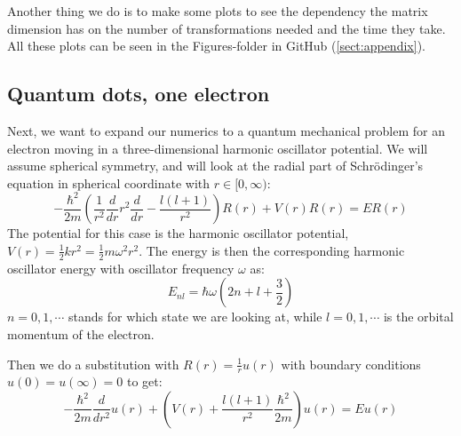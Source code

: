 \documentclass[12pt,a4paper,english]{article}
\begin{document}
Another thing we do is to make some plots to see the dependency the matrix dimension has on the number of transformations needed and the time they take. All these plots can be seen in the Figures-folder in GitHub (\ref{sect:appendix}).

\subsection{Quantum dots, one electron}
\label{sect:quantum_one}
Next, we want to expand our numerics to a quantum mechanical problem for an electron moving in a three-dimensional harmonic oscillator potential. We will assume spherical symmetry, and will look at the radial part of Schrödinger's equation in spherical coordinate with $r\in[0,\infty)$:
\begin{equation}
\label{eq:rad_schr_1}
-\frac{\hbar^2}{2m}\left(\frac{1}{r^2}\frac{d}{dr}r^2\frac{d}{dr}-\frac{l(l+1)}{r^2}\right)R(r) + V(r)R(r)=ER(r)
\end{equation}
The potential for this case is the harmonic oscillator potential, $V(r)=\frac{1}{2}kr^2=\frac{1}{2}m\omega^2r^2$. The energy is then the corresponding harmonic oscillator energy with oscillator frequency $\omega$ as:
\begin{equation}
\label{eq:HO_energy_1}
E_{nl} = \hbar \omega\left(2n + l + \frac{3}{2}\right)
\end{equation}
$n=0,1,\cdots$ stands for which state we are looking at, while $l=0,1,\cdots$ is the orbital momentum of the electron. 

Then we do a substitution with $R(r)=\frac{1}{r}u(r)$ with boundary conditions\\ $u(0)=u(\infty)=0$ to get:
\begin{equation}
\label{eq:before_scale}
-\frac{\hbar^2}{2m}\frac{d}{dr^2}u(r)+\left(V(r)+\frac{l(l+1)}{r^2}\frac{\hbar^2}{2m}\right)u(r)=Eu(r)
\end{equation}
\end{document}
